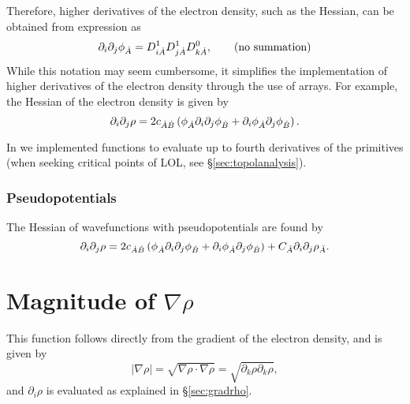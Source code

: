 Therefore, higher derivatives of the electron density, such as the Hessian, can be obtained from expression as
%
\begin{equation}
  \partial_i\partial_j\phi_{\dot{A}}=D_{i\dot{A}}^1D_{j\dot{A}}^1D^0_{k\dot{A}}, \qquad\textrm{(no summation)}
\end{equation}
%
While this notation may seem cumbersome, it simplifies the implementation of higher derivatives of the electron density through the use of arrays. For example, the Hessian of the electron density is given by
%
\begin{equation}
   \partial_i\partial_j\rho=2c_{\dot{A}\dot{B}}\left(\phi_{\dot{A}}\partial_i\partial_j\phi_{\dot{B}}+\partial_i\phi_{\dot{A}}\partial_j\phi_{\dot{B}}\right).
\end{equation}
%

In \DTK{} we implemented functions to evaluate up to fourth derivatives of the primitives
(when seeking critical points of LOL,
see \S\ref{sec:topolanalysis}).


\subsubsection{Pseudopotentials}

The Hessian of wavefunctions with pseudopotentials are found by
%
\begin{equation}%
  \partial_i\partial_j\rho=2c_{\dA\dB}\left(\phi_{\dA}\partial_i\partial_j\phi_{\dB}+\partial_i\phi_{\dA}\partial_j\phi_{\dB}\right)+C_{\bA}\partial_i\partial_j\rho_{\bA}.
\end{equation}
%


\section{Magnitude of $\nabla\rho$}
This function follows directly from the gradient of the electron density, and is given by
%
\begin{equation}
   |\nabla\rho|=\sqrt{\nabla\rho\cdot\nabla\rho}=\sqrt{\partial_k\rho\partial_k\rho},
\end{equation}
%
and $\partial_i\rho$ is evaluated as explained in \S\ref{sec:gradrho}.

